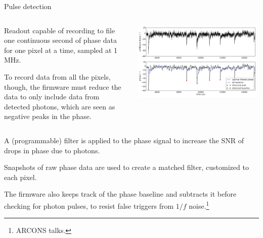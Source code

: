 \documentclass[ignorenonframetext,12pt]{beamer}
\begin{document}
\begin{frame}{Pulse detection}
				\begin{columns}
								\begin{column}{0.49\textwidth}
												\scriptsize{Readout capable of recording to file one continuous
												second of phase data for one pixel at a time, \alert{sampled at
												1\,MHz}. 

												To record data from all the pixels, though, the firmware must
												reduce the data to only include data from detected photons,
												which are seen as negative peaks in the phase.}
								\end{column}
								\begin{column}{0.49\textwidth}
												\centering
												\includegraphics[width=0.98\textwidth]{pulsos_de_fase}
								\end{column}
				\end{columns}
				\scriptsize{A (programmable) filter is applied to the phase signal to increase the
				SNR of drops in phase due to photons.  

				{\color{blue}Snapshots	of raw phase data are used to create a
				\alert{matched filter},	customized to each pixel.}

				The {\color{blue}firmware} also keeps track of the phase baseline and subtracts it
				before checking for photon pulses, to resist false triggers from $1/f$
				noise.\footnote{ARCONS talks.}}
\end{frame}
%
%
%
\end{document}
